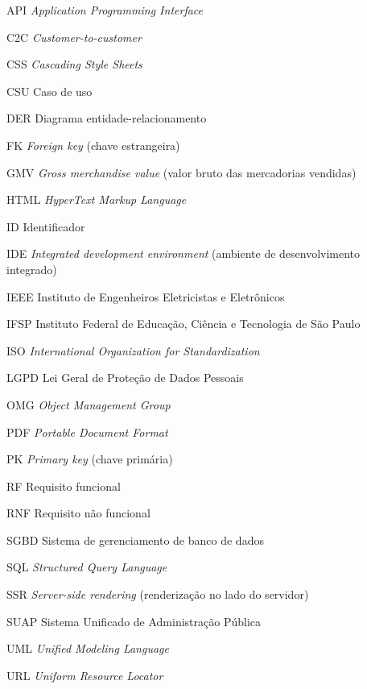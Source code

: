 \documentclass[
  12pt,
  a4paper,
  oneside,
  chapter=TITLE,
  subsection=TITLE,
  sumario=abnt-6027-2012,
  english,
  brazil
]{abntex2}
\begin{document}
\begin{siglas}
  \item[API] \emph{Application Programming Interface}
  \item[C2C] \emph{Customer-to-customer}
  \item[CSS] \emph{Cascading Style Sheets}
  \item[CSU] Caso de uso
  \item[DER] Diagrama entidade-relacionamento
  \item[FK] \emph{Foreign key} (chave estrangeira)
  \item[GMV] \emph{Gross merchandise value} (valor bruto das mercadorias vendidas)
  \item[HTML] \emph{HyperText Markup Language}
  \item[ID] Identificador
  \item[IDE] \emph{Integrated development environment} (ambiente de desenvolvimento integrado)
  \item[IEEE] Instituto de Engenheiros Eletricistas e Eletrônicos
  \item[IFSP] Instituto Federal de Educação, Ciência e Tecnologia de São Paulo
  \item[ISO] \emph{International Organization for Standardization}
  \item[LGPD] Lei Geral de Proteção de Dados Pessoais
  \item[OMG] \emph{Object Management Group}
  \item[PDF] \emph{Portable Document Format}
  \item[PK] \emph{Primary key} (chave primária)
  \item[RF] Requisito funcional
  \item[RNF] Requisito não funcional
  \item[SGBD] Sistema de gerenciamento de banco de dados
  \item[SQL] \emph{Structured Query Language}
  \item[SSR] \emph{Server-side rendering} (renderização no lado do servidor)
  \item[SUAP] Sistema Unificado de Administração Pública
  \item[UML] \emph{Unified Modeling Language}
  \item[URL] \emph{Uniform Resource Locator}
\end{siglas}

\tableofcontents*
\cleardoublepage

\textual
\end{document}
